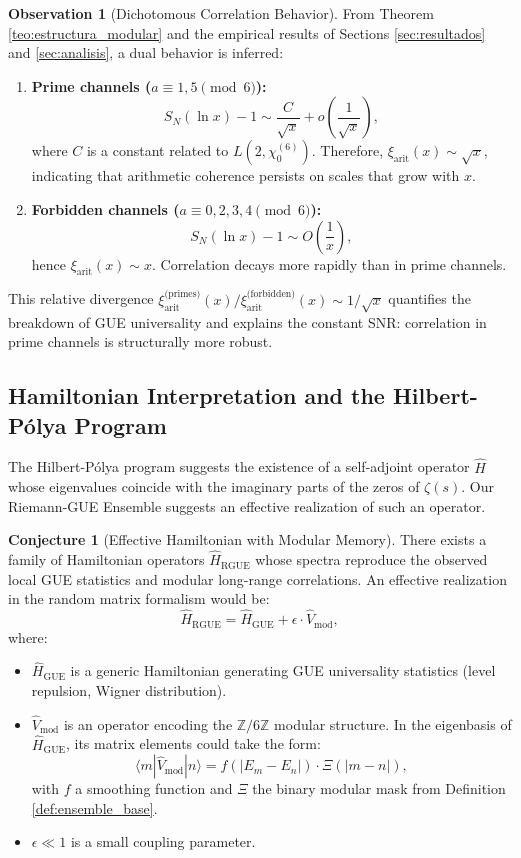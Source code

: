 \documentclass[12pt, a4paper]{article}
\theoremstyle{plain}
\theoremstyle{definition}
\newtheorem{observacion}[teorema]{Observation}
\newtheorem{conjetura}[teorema]{Conjecture}
\theoremstyle{remark}
\begin{document}
\begin{observacion}[Dichotomous Correlation Behavior]
From Theorem \ref{teo:estructura_modular} and the empirical results of Sections \ref{sec:resultados} and \ref{sec:analisis}, a dual behavior is inferred:
\begin{enumerate}
    \item \textbf{Prime channels ($a \equiv 1,5 \pmod{6}$):} 
    \[
    S_N(\ln x) - 1 \sim \frac{C}{\sqrt{x}} + o\left(\frac{1}{\sqrt{x}}\right),
    \]
    where $C$ is a constant related to $L(2, \chi_0^{(6)})$. Therefore, $\xi_{\text{arit}}(x) \sim \sqrt{x}$, indicating that arithmetic coherence persists on scales that grow with $x$.
    
    \item \textbf{Forbidden channels ($a \equiv 0,2,3,4 \pmod{6}$):}
    \[
    S_N(\ln x) - 1 \sim O\left(\frac{1}{x}\right),
    \]
    hence $\xi_{\text{arit}}(x) \sim x$. Correlation decays more rapidly than in prime channels.
\end{enumerate}
This relative divergence $\xi_{\text{arit}}^{\text{(primes)}}(x) / \xi_{\text{arit}}^{\text{(forbidden)}}(x) \sim 1/\sqrt{x}$ quantifies the breakdown of GUE universality and explains the constant SNR: correlation in prime channels is structurally more robust.
\end{observacion}

\subsection{Hamiltonian Interpretation and the Hilbert-Pólya Program}
\label{ap:hilbert_polya}

The Hilbert-Pólya program suggests the existence of a self-adjoint operator $\hat{H}$ whose eigenvalues coincide with the imaginary parts of the zeros of $\zeta(s)$. Our Riemann-GUE Ensemble suggests an effective realization of such an operator.

\begin{conjetura}[Effective Hamiltonian with Modular Memory]
There exists a family of Hamiltonian operators $\hat{H}_{\text{RGUE}}$ whose spectra reproduce the observed local GUE statistics and modular long-range correlations. An effective realization in the random matrix formalism would be:
\[
\hat{H}_{\text{RGUE}} = \hat{H}_{\text{GUE}} + \epsilon \cdot \hat{V}_{\text{mod}},
\]
where:
\begin{itemize}
    \item $\hat{H}_{\text{GUE}}$ is a generic Hamiltonian generating GUE universality statistics (level repulsion, Wigner distribution).
    \item $\hat{V}_{\text{mod}}$ is an operator encoding the $\mathbb{Z}/6\mathbb{Z}$ modular structure. In the eigenbasis of $\hat{H}_{\text{GUE}}$, its matrix elements could take the form:
    \[
    \langle m | \hat{V}_{\text{mod}} | n \rangle = f(|E_m - E_n|) \cdot \Xi(|m-n|),
    \]
    with $f$ a smoothing function and $\Xi$ the binary modular mask from Definition \ref{def:ensemble_base}.
    \item $\epsilon \ll 1$ is a small coupling parameter.
\end{itemize}
\end{conjetura}
\end{document}
